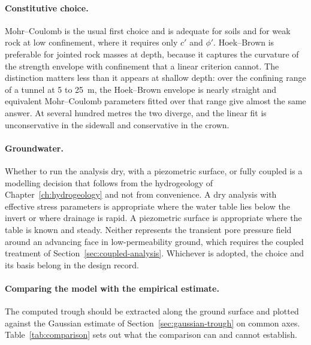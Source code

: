\paragraph{Constitutive choice.}
Mohr--Coulomb is the usual first choice and is adequate for soils and for weak
rock at low confinement, where it requires only $c'$ and $\phi'$. Hoek--Brown
is preferable for jointed rock masses at depth, because it captures the
curvature of the strength envelope with confinement that a linear criterion
cannot. The distinction matters less than it appears at shallow depth: over the
confining range of a tunnel at 5 to 25~m, the Hoek--Brown envelope is nearly
straight and equivalent Mohr--Coulomb parameters fitted over that range give
almost the same answer. At several hundred metres the two diverge, and the
linear fit is unconservative in the sidewall and conservative in the crown.

\paragraph{Groundwater.}
Whether to run the analysis dry, with a piezometric surface, or fully coupled
is a modelling decision that follows from the hydrogeology of
Chapter~\ref{ch:hydrogeology} and not from convenience. A dry analysis with
effective stress parameters is appropriate where the water table lies below the
invert or where drainage is rapid. A piezometric surface is appropriate where
the table is known and steady. Neither represents the transient pore pressure
field around an advancing face in low-permeability ground, which requires the
coupled treatment of Section~\ref{sec:coupled-analysis}. Whichever is adopted,
the choice and its basis belong in the design record.

\paragraph{Comparing the model with the empirical estimate.}
The computed trough should be extracted along the ground surface and plotted
against the Gaussian estimate of Section~\ref{sec:gaussian-trough} on common
axes. Table~\ref{tab:comparison} sets out what the comparison can and cannot
establish.

